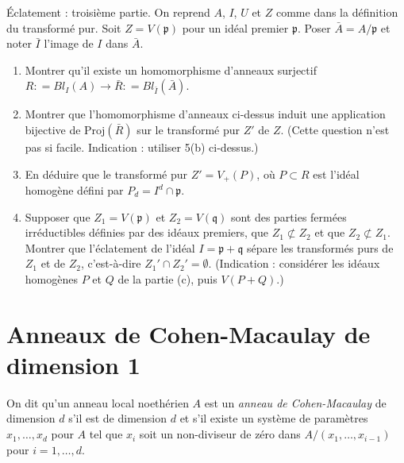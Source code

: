 \begin{exercise}
\label{exercise-blowing-up-III}
Éclatement : troisième partie.
On reprend $A$, $I$, $U$ et $Z$ comme dans la définition du transformé pur.
Soit $Z = V({\mathfrak p})$ pour un idéal premier ${\mathfrak p}$. Poser $\bar A =
A/{\mathfrak p}$ et noter
$\bar I$ l'image de $I$ dans $\bar A$.
\begin{enumerate}
\item Montrer qu'il existe un homomorphisme d'anneaux surjectif
$R: = Bl_I(A) \to \bar R: = Bl_{\bar I}(\bar A)$.
\item Montrer que l'homomorphisme d'anneaux ci-dessus induit une application bijective
de $\text{Proj}(\bar R)$ sur le transformé pur $Z'$ de $Z$. (Cette question
n'est pas si facile. Indication : utiliser 5(b) ci-dessus.)
\item En déduire que le transformé pur $Z' = V_{+}(P)$, où
$P \subset R$ est l'idéal homogène défini par
$P_d = I^d \cap {\mathfrak p}$.
\item Supposer que $Z_1 = V({\mathfrak p})$ et
$Z_2 = V({\mathfrak q})$ sont des parties fermées irréductibles
définies par des idéaux premiers, que $Z_1 \not \subset Z_2$
et que $Z_2 \not \subset Z_1$. Montrer que l'éclatement de l'idéal
$I = {\mathfrak p} + {\mathfrak q}$ sépare les
transformés purs de $Z_1$ et de $Z_2$,
c'est-à-dire $Z_1' \cap Z_2' = \emptyset$. (Indication : considérer les idéaux homogènes
$P$ et $Q$ de la partie (c), puis $V(P + Q)$.)
\end{enumerate}
\end{exercise}


\section{Anneaux de Cohen-Macaulay de dimension 1}
\label{section-CM-dim-1}

\begin{definition}
\label{definition-CM}
On dit qu'un anneau local noethérien $A$ est un {\it anneau de Cohen-Macaulay}
de dimension $d$ s'il est de dimension $d$ et s'il existe un système
de paramètres $x_1, \ldots, x_d$ pour $A$ tel que $x_i$ soit un non-diviseur de zéro
dans $A/(x_1, \ldots, x_{i-1})$ pour $i = 1, \ldots, d$.
\end{definition}

